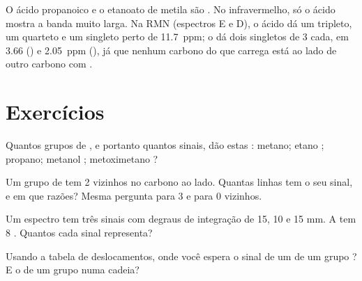 \begin{example}\label{ex:g12:proton-nmr:isomers}
O ácido propanoico  e o etanoato de metila
 são . No infravermelho, só o ácido mostra a
banda  muito larga. Na RMN (espectros E e D), o ácido dá um
tripleto, um quarteto e um singleto perto de \qty{11.7}{ppm}; o  dá
dois singletos de 3  cada, em 3.66 () e
\qty{2.05}{ppm} (), já que nenhum carbono do  que
carrega  está ao lado de outro carbono com .
\end{example}

\section{Exercícios}

\begin{exercise}[$\star$]\label{exo:g12:proton-nmr:1}
Quantos grupos de , e portanto quantos sinais, dão
estas : metano; etano ; propano; metanol
; metoximetano ?
\end{exercise}

\begin{exercise}[$\star$]\label{exo:g12:proton-nmr:2}
Um grupo de  tem 2  vizinhos no carbono ao lado. Quantas
linhas tem o seu sinal, e em que razões? Mesma pergunta para 3 e para 0
vizinhos.
\end{exercise}

\begin{exercise}[$\star$]\label{exo:g12:proton-nmr:3}
Um espectro tem três sinais com degraus de integração de 15, 10 e
15 mm. A  tem 8 . Quantos  cada sinal representa?
\end{exercise}

\begin{exercise}[$\star$]\label{exo:g12:proton-nmr:4}
Usando a tabela de deslocamentos, onde você espera o sinal de um 
de um grupo ? E o de um grupo  numa cadeia?
\end{exercise}

